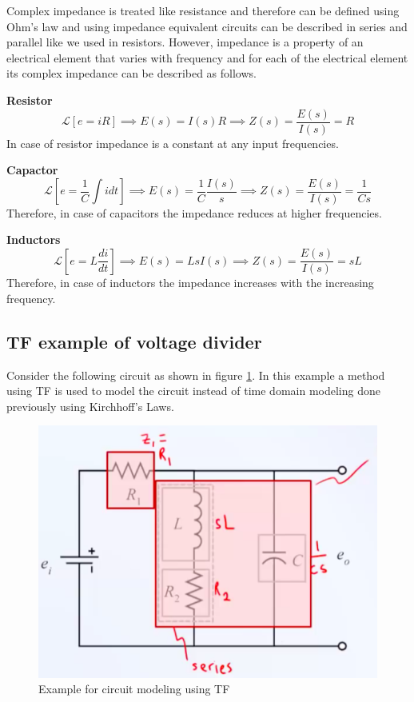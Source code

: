 Complex impedance is treated like resistance and therefore can be defined using Ohm's law and using impedance equivalent circuits can be described in series and parallel like we used in resistors. However, impedance is a property of an electrical element that varies with frequency and for each of the electrical element its complex impedance can be described as follows.

\textbf{Resistor}
\begin{equation}
	\mathcal{L}[e = i R] \implies E(s) = I(s)R \implies Z(s) = \frac{E(s)}{I(s)} = R
\end{equation}
In case of resistor impedance is a constant at any input frequencies.

\textbf{Capactor}
\begin{equation}
	\mathcal{L}[e = \frac{1}{C} \int i dt] \implies E(s) = \frac{1}{C} \frac{I(s)}{s} \implies Z(s) = \frac{E(s)}{I(s)} = \frac{1}{Cs}
\end{equation}
Therefore, in case of capacitors the impedance reduces at higher frequencies.

\textbf{Inductors}
\begin{equation}
	\mathcal{L}[e = L \frac{di}{dt}] \implies E(s) = L s I(s) \implies Z(s) = \frac{E(s)}{I(s)} = s L
\end{equation}
Therefore, in case of inductors the impedance increases with the increasing frequency.

\subsection{TF example of voltage divider}

Consider the following circuit as shown in figure \ref{Fig_Fund_ELK_Voltage_Divider}. In this example a method using TF is used to model the circuit instead of time domain modeling done previously using Kirchhoff's Laws.
\begin{figure}[h!]
	\centering
	\includegraphics[width=0.75\linewidth]{Bilder/Fund_ELK_Voltage_DIvider}
	\caption{Example for circuit modeling using TF}
	\label{Fig_Fund_ELK_Voltage_Divider}
\end{figure}

